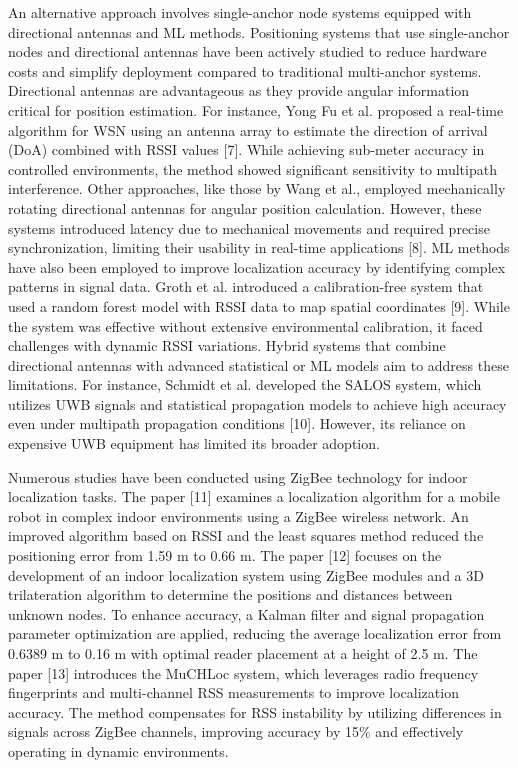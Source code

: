 An alternative approach involves single-anchor node systems equipped
with directional antennas and ML methods. Positioning systems that use
single-anchor nodes and directional antennas have been actively studied
to reduce hardware costs and simplify deployment compared to traditional
multi-anchor systems. Directional antennas are advantageous as they
provide angular information critical for position estimation. For
instance, Yong Fu et al. proposed a real-time algorithm for WSN using an
antenna array to estimate the direction of arrival (DoA) combined with
RSSI values {[}7{]}. While achieving sub-meter accuracy in controlled
environments, the method showed significant sensitivity to multipath
interference. Other approaches, like those by Wang et al., employed
mechanically rotating directional antennas for angular position
calculation. However, these systems introduced latency due to mechanical
movements and required precise synchronization, limiting their usability
in real-time applications {[}8{]}. ML methods have also been employed to
improve localization accuracy by identifying complex patterns in signal
data. Groth et al. introduced a calibration-free system that used a
random forest model with RSSI data to map spatial coordinates {[}9{]}.
While the system was effective without extensive environmental
calibration, it faced challenges with dynamic RSSI variations. Hybrid
systems that combine directional antennas with advanced statistical or
ML models aim to address these limitations. For instance, Schmidt et al.
developed the SALOS system, which utilizes UWB signals and statistical
propagation models to achieve high accuracy even under multipath
propagation conditions {[}10{]}. However, its reliance on expensive UWB
equipment has limited its broader adoption.

Numerous studies have been conducted using ZigBee technology for indoor
localization tasks. The paper {[}11{]} examines a localization algorithm
for a mobile robot in complex indoor environments using a ZigBee
wireless network. An improved algorithm based on RSSI and the least
squares method reduced the positioning error from 1.59 m to 0.66 m. The
paper {[}12{]} focuses on the development of an indoor localization
system using ZigBee modules and a 3D trilateration algorithm to
determine the positions and distances between unknown nodes. To enhance
accuracy, a Kalman filter and signal propagation parameter optimization
are applied, reducing the average localization error from 0.6389 m to
0.16 m with optimal reader placement at a height of 2.5 m. The paper
{[}13{]} introduces the MuCHLoc system, which leverages radio frequency
fingerprints and multi-channel RSS measurements to improve localization
accuracy. The method compensates for RSS instability by utilizing
differences in signals across ZigBee channels, improving accuracy by
15\% and effectively operating in dynamic environments.

